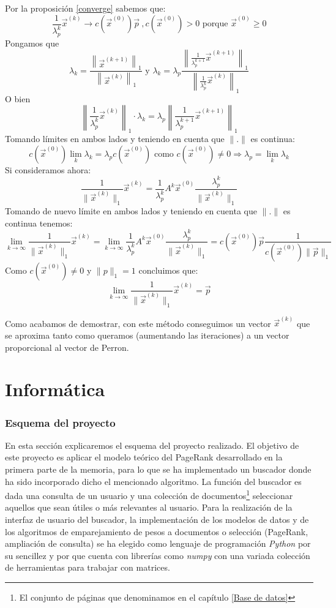 \documentclass[size=a4, parskip=half, titlepage=false, toc=flat, toc=bib, 12pt, twoside]{scrartcl}
\theoremstyle{theorem-style}
\theoremstyle{definition-style}
\theoremstyle{remark-style}
\theoremstyle{example-style}
\theoremstyle{definition-style}
\theoremstyle{remark-style}
\begin{document}
Por la proposición \ref{converge} sabemos que:
$$\frac{1}{\lambda_p^k} \vec{x}^{(k)} \rightarrow c(\vec{x}^{(0)})\vec{p} \ , c(\vec{x}^{(0)}) > 0 \textrm{ porque } \vec{x}^{(0)} \geq 0$$
Pongamos que
$$\lambda_k = \frac{\left\|\vec{x}^{(k+1)}\right\|_1}{\left\|\vec{x}^{(k)}\right\|_1} \textrm{ y } \lambda_k = \lambda_p \frac{\left\|\frac{1}{\lambda_p^{k+1}} \vec{x}^{(k+1)}\right\|_1}{\left\|\frac{1}{\lambda_p^k} \vec{x}^{(k)}\right\|_1}$$
O bien
$$\left\|\frac{1}{\lambda_p^k} \vec{x}^{(k)} \right\|_1 \cdot \lambda_k  = \lambda_p \left\| \frac{1}{\lambda_p^{k+1}} \vec{x}^{(k+1)} \right\|_1$$
Tomando límites en ambos lados y teniendo en cuenta que $\|.\|$ es continua:
$$c(\vec{x}^{(0)}) \lim_{k} \lambda_k = \lambda_p c(\vec{x}^{(0)}) \textrm{ como } c(\vec{x}^{(0)}) \neq 0  \Rightarrow \lambda_p = \lim_{k} \lambda_k $$
Si consideramos ahora:
$$\frac{1}{\|\vec{x}^{(k)}\|_1} \vec{x}^{(k)}= \frac{1}{\lambda_p^{k}} A^k \vec{x}^{(0)} \frac{\lambda_p^k}{\|\vec{x}^{(k)}\|_1} $$
Tomando de nuevo límite en ambos lados y teniendo en cuenta que $\|. \|$ es continua tenemos:
$$\lim_{k \to \infty} \frac{1}{\|\vec{x}^{(k)}\|_1} \vec{x}^{(k)}= \lim_{k \to \infty} \frac{1}{\lambda_p^k} A^k \vec{x}^{(0)} \frac{\lambda_p^k}{\|\vec{x}^{(k)}\|_1} = c(\vec{x}^{(0)}) \vec{p} \frac{1}{c(\vec{x}^{(0)}) \|\vec{p}\|_1} $$
Como $c(\vec{x}^{(0)}) \neq 0$ y $\|p \|_1 = 1$ concluimos que:
$$\lim_{k \to \infty} \frac{1}{\|\vec{x}^{(k)}\|_1} \vec{x}^{(k)} = \vec{p} $$

Como acabamos de demostrar, con este método conseguimos un vector $\vec{x}^{(k)}$ que se aproxima tanto como queramos (aumentando las iteraciones) a un vector proporcional al vector de Perron.

\newpage
\thispagestyle{empty}
\afterpage{\null\newpage}
\newpage

\part{Informática}

\section{Esquema del proyecto}

En esta sección explicaremos el esquema del proyecto realizado. El objetivo de este proyecto es aplicar el modelo teórico del PageRank desarrollado en la primera parte de la memoria, para lo que se ha implementado un buscador donde ha sido incorporado dicho el mencionado algoritmo. La función del buscador es dada una consulta de un usuario y una colección de documentos\footnote{El conjunto de páginas que denominamos en el capítulo \ref{Base de datos}} seleccionar aquellos que sean útiles o más relevantes al usuario. Para la realización de la interfaz de usuario del buscador, la implementación de los modelos de datos y de los algoritmos de emparejamiento de pesos a documentos o selección (PageRank, ampliación de consulta) se ha elegido como lenguaje de programación \textit{Python} por su sencillez y por que cuenta con librerías como \textit{numpy} con una variada colección de herramientas para trabajar con matrices.
\end{document}
